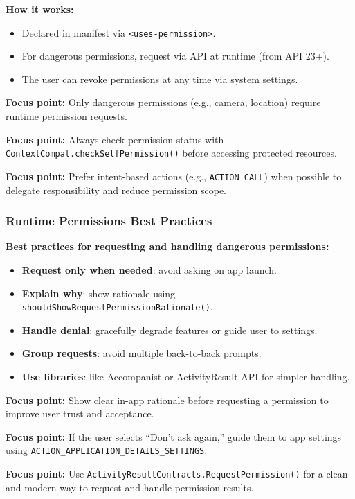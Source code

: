 \documentclass[a4paper,12pt]{article}
\begin{document}
\textbf{How it works:}
\begin{itemize}
  \item Declared in manifest via \texttt{<uses-permission>}.
  \item For dangerous permissions, request via API at runtime (from API 23+).
  \item The user can revoke permissions at any time via system settings.
\end{itemize}

\textbf{Focus point:} Only dangerous permissions (e.g., camera, location) require runtime permission requests.

\textbf{Focus point:} Always check permission status with \texttt{ContextCompat.checkSelfPermission()} before accessing protected resources.

\textbf{Focus point:} Prefer intent-based actions (e.g., \texttt{ACTION\_CALL}) when possible to delegate responsibility and reduce permission scope.

\subsubsection{Runtime Permissions Best Practices}

\textbf{Best practices for requesting and handling dangerous permissions:}
\begin{itemize}
  \item \textbf{Request only when needed}: avoid asking on app launch.
  \item \textbf{Explain why}: show rationale using \texttt{shouldShowRequestPermissionRationale()}.
  \item \textbf{Handle denial}: gracefully degrade features or guide user to settings.
  \item \textbf{Group requests}: avoid multiple back-to-back prompts.
  \item \textbf{Use libraries}: like Accompanist or ActivityResult API for simpler handling.
\end{itemize}

\textbf{Focus point:} Show clear in-app rationale before requesting a permission to improve user trust and acceptance.

\textbf{Focus point:} If the user selects “Don’t ask again,” guide them to app settings using \texttt{ACTION\_APPLICATION\_DETAILS\_SETTINGS}.

\textbf{Focus point:} Use \texttt{ActivityResultContracts.RequestPermission()} for a clean and modern way to request and handle permission results.
\end{document}
